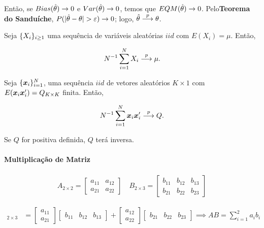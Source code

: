 \documentclass[11pt,oneside,a4paper]{article}
\numberwithin{equation}{section}
\begin{document}
Então, se $Bias(\hat{\theta}) \to 0$ e $Var(\hat{\theta}) \to 0$, temos que $EQM(\hat{\theta}) \to 0$.
Pelo\textbf{Teorema do Sanduíche}, $P(|\hat{\theta} - \theta| > \varepsilon) \to 0$; logo, $\hat{\theta}  \overset{p}{\longrightarrow}  \theta$.

\begin{def1}
Seja $\{X_{i}\}_{i \geq 1}$ uma sequência de variáveis aleatórias $iid$ com $E(X_{i}) = \mu$.
Então, 

\vspace{-1 em}
\begin{align*}
	N^{-1} \sum_{i=1}^{N} X_{i}  \overset{p}{\longrightarrow}  \mu.
\end{align*}
\end{def1}

\begin{def1}
Seja $\{\boldsymbol{x}_{i}\}_{i=1}^{N}$, uma sequência $iid$ de vetores aleatórios $K \times 1$ com $E(\boldsymbol{x}_{i} \boldsymbol{x}_{i}') = Q_{K \times K}$ finita.
Então, 

\vspace{-1 em}
\begin{align*}
N^{-1} \sum_{i=1}^{N}
\boldsymbol{x}_{i} \boldsymbol{x}_{i}'
 \overset{p}{\longrightarrow}  Q.
\end{align*}

Se $Q$ for positiva definida, $Q$ terá inversa.
\end{def1}

\paragraph{Multiplicação de Matriz}

\begin{align*}
A_{2 \times 2} =
\begin{bmatrix}
	a_{11} & a_{12} \\
	a_{21} & a_{22}		
\end{bmatrix}
\quad
B_{2 \times 3} =
\begin{bmatrix}
	b_{11} & b_{12} & b_{13} \\
	b_{21} & b_{22} & b_{23}		
\end{bmatrix}
\end{align*}

\begin{align*}
[AB]_{2 \times 3} &=
\begin{bmatrix}
	a_{11} \\ a_{21}
\end{bmatrix}
\begin{bmatrix}
	b_{11} & b_{12} & b_{13}
\end{bmatrix}
+
\begin{bmatrix}
	a_{12} \\ a_{22}
\end{bmatrix}
\begin{bmatrix}
	b_{21} & b_{22} & b_{23}
\end{bmatrix}
\implies
AB = \sum_{i=1}^{2} a_{i}b_{i}
\end{align*}
\end{document}
